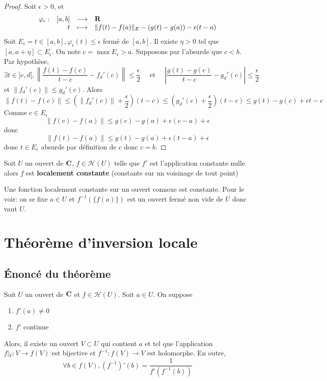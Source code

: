 \begin{proof}
Soit $\epsilon >0$, et \[
\begin{array}{rrcl}
    \varphi_\epsilon:& [a,b] & \longrightarrow & \mathbf R \\
               & t & \longmapsto & \displaystyle \|f(t)-f(a)\|_E-(g(t)-g(a))-\epsilon(t-a)
\end{array}
\] 
Soit $E_\epsilon={t \in  [a, b], \varphi_\epsilon(t)\leq \epsilon}$ fermé de $[a, b]$. Il existe  $\eta>0$ tel que  $[a, a+\eta]\subset E_\epsilon$. On note  $c=\max E_\epsilon>a$. Supposons par l'absurde que  $c<b$. Par hypothèse,  \[
    \exists  t \in  ]c, d[, \left\|\frac{f(t)-f(c)}{t-c}-f_d'(c)\right\|\leq \frac{\epsilon}{2}\quad \text{ et } \quad  \left| \frac{g(t)-g(c)}{t-c}-g_d'(c) \right|\leq \frac{\epsilon}{2}
\] 
et $\|f_d'(c)\|\leq g_d'(c)$. Alors 
\[
    \|f(t)-f(c)\|\leq \left( \|f_d'(c)\|+\frac{\epsilon}{2} \right) (t-c)\leq \left( g_d'(c)+ \frac{\epsilon}{2} \right)(t-c)\leq g(t)-g(c)+\epsilon{t-c}
\] 
Comme $c \in  E_\epsilon$ \[
    \|f(c)-f(a)\|\leq  g(c)-g(a)+\epsilon(c-a)+\epsilon
\] 
donc \[
    \|f(t)-f(a)\|\leq g(t)-g(a)+\epsilon(t-a)+\epsilon
\] 
donc $t \in  E_\epsilon$ absurde par définition de $c$ donc $c=b$.
\end{proof}

\begin{cor}
    Soit $U$ un ouvert de  $\mathbf C$, $f \in  \mathcal  H(U)$ telle que $f'$ est l'application constante nulle alors  $f$ est \textbf{localement constante} (constante sur un voisinage de tout point)
\end{cor}

\begin{rem}
    Une fonction localement constante sur un ouvert connexe est constante. Pour le voir: on se fixe $a \in  U$ et $f^{-1}(\{f(a)\})$ est un ouvert fermé non vide de $U$ donc vaut  $U$.
\end{rem}

\section{Théorème d'inversion locale}

\subsection{Énoncé du théorème}

\begin{thm}
    Soit $U$ un ouvert de  $\mathbf C$ et $f \in  \mathcal  H(U)$. Soit $a \in  U$. On suppose \begin{enumerate}[label=(\emph{\roman*})]
    \item $f'(a)\neq 0$
    \item $f'$ continue
\end{enumerate}
Alors, il existe un ouvert $V\subset U$ qui contient $a$ et tel que l'application  $f\left|_{V}\right.:V\longrightarrow f(V)$ est bijective et $f^{-1}:f(V)\longrightarrow V$ est holomorphe. En outre, \[
    \forall  b \in  f(V), (f^{-1})'(b)=\frac1{f'(f^{-1}(b))}
\] 
\end{thm}

